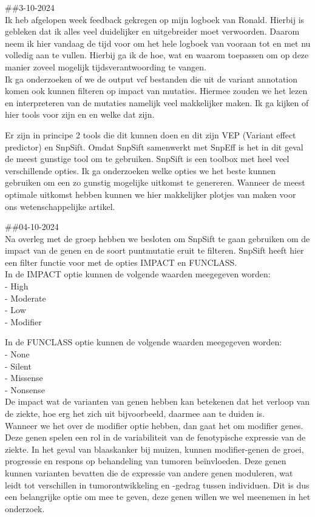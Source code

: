 \documentclass[
]{article}
\begin{document}
\#\#3-10-2024\\
Ik heb afgelopen week feedback gekregen op mijn logboek van Ronald.
Hierbij is gebleken dat ik alles veel duidelijker en uitgebreider moet
verwoorden. Daarom neem ik hier vandaag de tijd voor om het hele logboek
van vooraan tot en met nu volledig aan te vullen. Hierbij ga ik de hoe,
wat en waarom toepassen om op deze manier zoveel mogelijk
tijdsverantwoording te vangen.\\

Ik ga onderzoeken of we de output vcf bestanden die uit de variant
annotation komen ook kunnen filteren op impact van mutaties. Hiermee
zouden we het lezen en interpreteren van de mutaties namelijk veel
makkelijker maken. Ik ga kijken of hier tools voor zijn en en welke dat
zijn. ~

Er zijn in principe 2 tools die dit kunnen doen en dit zijn VEP (Variant
effect predictor) en SnpSift. Omdat SnpSift samenwerkt met SnpEff is het
in dit geval de meest gunstige tool om te gebruiken. SnpSift is een
toolbox met heel veel verschillende opties. Ik ga onderzoeken welke
opties we het beste kunnen gebruiken om een zo gunstig mogelijke
uitkomst te genereren. Wanneer de meest optimale uitkomst hebben kunnen
we hier makkelijker plotjes van maken voor ons wetenschappelijke
artikel.

\#\#04-10-2024\\
Na overleg met de groep hebben we besloten om SnpSift te gaan gebruiken
om de impact van de genen en de soort puntmutatie eruit te filteren.
SnpSift heeft hier een filter functie voor met de opties IMPACT en
FUNCLASS.\\
In de IMPACT optie kunnen de volgende waarden meegegeven worden:\\
- High\\
- Moderate\\
- Low\\
- Modifier ~

In de FUNCLASS optie kunnen de volgende waarden meegegeven worden:\\
- None\\
- Silent\\
- Missense\\
- Nonsense\\

De impact wat de varianten van genen hebben kan betekenen dat het
verloop van de ziekte, hoe erg het zich uit bijvoorbeeld, daarmee aan te
duiden is.\\

Wanneer we het over de modifier optie hebben, dan gaat het om modifier
genes. Deze genen spelen een rol in de variabiliteit van de fenotypische
expressie van de ziekte. In het geval van blaaskanker bij muizen, kunnen
modifier-genen de groei, progressie en respons op behandeling van
tumoren beïnvloeden. Deze genen kunnen varianten bevatten die de
expressie van andere genen moduleren, wat leidt tot verschillen in
tumorontwikkeling en -gedrag tussen individuen. Dit is dus een
belangrijke optie om mee te geven, deze genen willen we wel meenemen in
het onderzoek.\\
\end{document}
